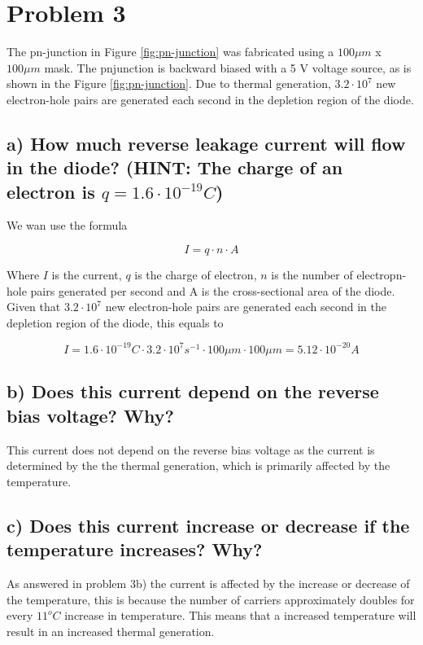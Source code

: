 \section{Problem 3}

The pn-junction in Figure \ref*{fig:pn-junction} was fabricated using a $100 \mu m$ x $100 \mu m$ mask. The pnjunction is backward biased with a 5 V voltage source, as is shown in the Figure \ref*{fig:pn-junction}. Due to thermal generation, $3.2 \cdot 10^7$ new electron-hole pairs are generated each second in the depletion region of the diode.


\subsection*{a) How much reverse leakage current will flow in the diode? (HINT: The charge of an
electron is $q = 1.6 \cdot 10^{-19} C$)}

We wan use the formula

\begin{equation*}
    I=q\cdot n \cdot A
\end{equation*}

Where $I$ is the current, $q$ is the charge of electron, $n$ is the number of electropn-hole pairs generated per second and A is the cross-sectional area of the diode. Given that $3.2 \cdot 10^7$ new electron-hole pairs are generated each second in the depletion region of the diode, this equals to 

\begin{equation*}
    I=1.6 \cdot 10^{-19} C \cdot 3.2 \cdot 10^7 s^{-1} \cdot 100 \mu m \cdot 100 \mu m = 5.12\cdot 10^{-20} A
\end{equation*}

\subsection*{b) Does this current depend on the reverse bias voltage? Why?}
This current does not depend on the reverse bias voltage as the current is determined by the the thermal generation, which is primarily affected by the temperature.

\subsection*{c) Does this current increase or decrease if the temperature increases? Why?}
As answered in problem 3b) the current is affected by the increase or decrease of the temperature, this is because the number of carriers approximately doubles for every $11^o C$ increase in temperature. This means that a increased temperature will result in an increased thermal generation.

